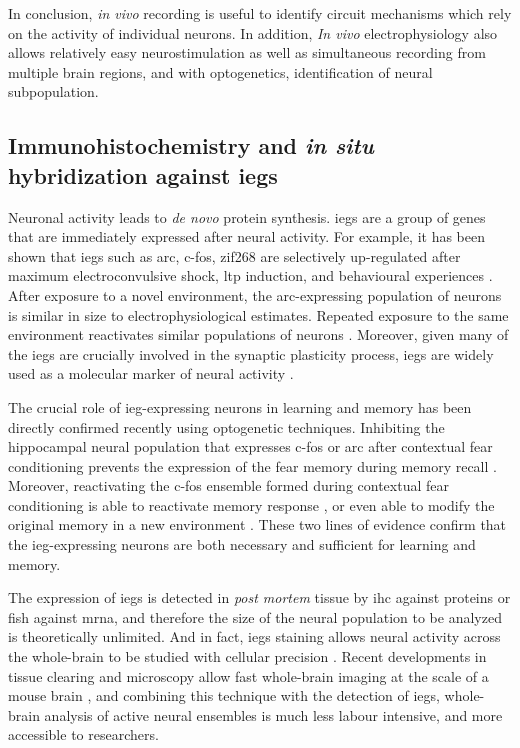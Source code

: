 In conclusion, \textit{in vivo} recording is useful to identify circuit mechanisms which rely on the activity of individual neurons. In addition, \textit{In vivo} electrophysiology also allows relatively easy neurostimulation as well as simultaneous recording from multiple brain regions, and with optogenetics, identification of neural subpopulation. 

\subsection{Immunohistochemistry and \textit{in situ} hybridization against \glspl{ieg}}
Neuronal activity leads to \textit{de novo} protein synthesis. \Glspl{ieg} are a group of genes that are immediately expressed after neural activity. For example, it has been shown that \glspl{ieg} such as \gls{arc}, c-fos, zif268 are selectively up-regulated after maximum electroconvulsive shock, \gls{ltp} induction, and behavioural experiences \citep{guzowski99, vann00, hall01}. After exposure to a novel environment, the \gls{arc}-expressing population of neurons is similar in size to electrophysiological estimates. Repeated exposure to the same environment reactivates similar populations of neurons \citep{guzowski06, niibori12}. Moreover, given many of the \glspl{ieg} are crucially involved in the synaptic plasticity process, \glspl{ieg} are widely used as a molecular marker of neural activity \citep{minatohara15}. 

The crucial role of \gls{ieg}-expressing neurons in learning and memory has been directly confirmed recently using optogenetic techniques. Inhibiting the hippocampal neural population that expresses c-fos or \gls{arc} after contextual fear conditioning prevents the expression of the fear memory during memory recall \citep{denny14, tanaka14}. Moreover, reactivating the c-fos ensemble formed during contextual fear conditioning is able to reactivate memory response \citep{liu12, cowansage14, ohkawa15}, or even able to modify the original memory in a new environment \citep{ramirez13, redondo14}. These two lines of evidence confirm that the \gls{ieg}-expressing neurons are both necessary and sufficient for learning and memory. 

The expression of \glspl{ieg} is detected in \textit{post mortem} tissue by \gls{ihc} against proteins or \gls{fish} against \gls{mrna}, and therefore the size of the neural population to be analyzed is theoretically unlimited. And in fact, \glspl{ieg} staining allows neural activity across the whole-brain to be studied with cellular precision \citep{wheeler13}. Recent developments in tissue clearing and microscopy allow fast whole-brain imaging at the scale of a mouse brain \citep{chung13, tomer14}, and combining this technique with the detection of \glspl{ieg}, whole-brain analysis of active neural ensembles is much less labour intensive, and more accessible to researchers.   

